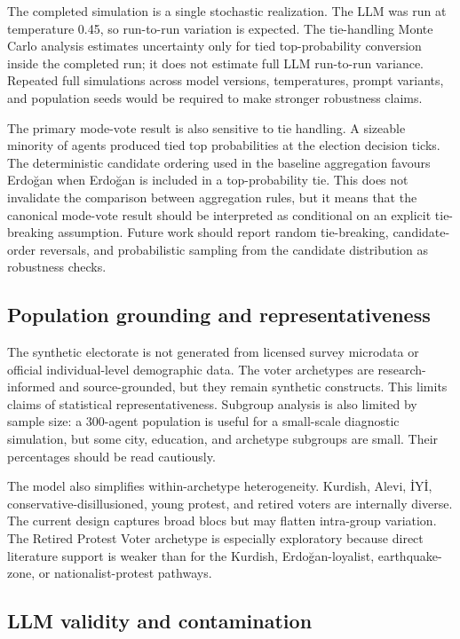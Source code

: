 \documentclass[pdflatex,sn-mathphys-num,iicol]{sn-jnl}
\begin{document}
The completed simulation is a single stochastic realization. The LLM was run at
temperature 0.45, so run-to-run variation is expected. The tie-handling Monte
Carlo analysis estimates uncertainty only for tied top-probability conversion
inside the completed run; it does not estimate full LLM run-to-run variance.
Repeated full simulations across model versions, temperatures, prompt variants,
and population seeds would be required to make stronger robustness claims.

The primary mode-vote result is also sensitive to tie handling. A sizeable
minority of agents produced tied top probabilities at the election decision
ticks. The deterministic candidate ordering used in the baseline aggregation
favours Erdoğan when Erdoğan is included in a top-probability tie. This does
not invalidate the comparison between aggregation rules, but it means that the
canonical mode-vote result should be interpreted as conditional on an explicit
tie-breaking assumption. Future work should report random tie-breaking,
candidate-order reversals, and probabilistic sampling from the candidate
distribution as robustness checks.

\subsection{Population grounding and
representativeness}\label{subsec:population}

The synthetic electorate is not generated from licensed survey microdata or
official individual-level demographic data. The voter archetypes are
research-informed and source-grounded, but they remain synthetic constructs.
This limits claims of statistical representativeness. Subgroup analysis is also
limited by sample size: a 300-agent population is useful for a small-scale
diagnostic simulation, but some city, education, and archetype subgroups are
small. Their percentages should be read cautiously.

The model also simplifies within-archetype heterogeneity. Kurdish, Alevi, İYİ,
conservative-disillusioned, young protest, and retired voters are internally
diverse. The current design captures broad blocs but may flatten intra-group
variation. The Retired Protest Voter archetype is especially exploratory because
direct literature support is weaker than for the Kurdish, Erdoğan-loyalist,
earthquake-zone, or nationalist-protest pathways.

\subsection{LLM validity and contamination}\label{subsec:llmvalidity}
\end{document}
